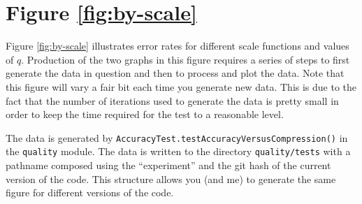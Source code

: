 \documentclass[]{statsoc}
\begin{document}
\section{Figure \ref{fig:by-scale}}
Figure \ref{fig:by-scale} illustrates error rates for different scale functions and values of $q$. Production of the two graphs in this figure requires a series of steps to first generate the data in question and then to process and plot the data. Note that this figure will vary a fair bit each time you generate new data. This is due to the fact that the number of iterations used to generate the data is pretty small in order to keep the time required for the test to a reasonable level.

The data is generated by {\tt AccuracyTest.testAccuracyVersusCompression()} in the {\tt quality} module. The data is written to the directory {\tt quality/tests} with a pathname composed using the ``experiment'' and the git hash of the current version of the code. This structure allows you (and me) to generate the same figure for different versions of the code.
\end{document}
